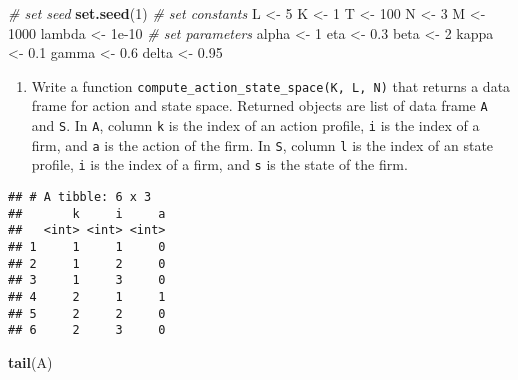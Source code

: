 \documentclass[
]{book}
\newenvironment{Shaded}{\begin{snugshade}}{\end{snugshade}}
\newcommand{\CommentTok}[1]{\textcolor[rgb]{0.56,0.35,0.01}{\textit{#1}}}
\newcommand{\DecValTok}[1]{\textcolor[rgb]{0.00,0.00,0.81}{#1}}
\newcommand{\FloatTok}[1]{\textcolor[rgb]{0.00,0.00,0.81}{#1}}
\newcommand{\KeywordTok}[1]{\textcolor[rgb]{0.13,0.29,0.53}{\textbf{#1}}}
\newcommand{\NormalTok}[1]{#1}
\newcommand{\OperatorTok}[1]{\textcolor[rgb]{0.81,0.36,0.00}{\textbf{#1}}}
\newcommand{\StringTok}[1]{\textcolor[rgb]{0.31,0.60,0.02}{#1}}
\providecommand{\tightlist}{%
  \setlength{\itemsep}{0pt}\setlength{\parskip}{0pt}}
\begin{document}
\begin{Shaded}
\begin{Highlighting}[]
\CommentTok{# set seed}
\KeywordTok{set.seed}\NormalTok{(}\DecValTok{1}\NormalTok{)}
\CommentTok{# set constants }
\NormalTok{L <-}\StringTok{ }\DecValTok{5}
\NormalTok{K <-}\StringTok{ }\DecValTok{1}
\NormalTok{T <-}\StringTok{ }\DecValTok{100}
\NormalTok{N <-}\StringTok{ }\DecValTok{3}
\NormalTok{M <-}\StringTok{ }\DecValTok{1000}
\NormalTok{lambda <-}\StringTok{ }\FloatTok{1e-10}
\CommentTok{# set parameters}
\NormalTok{alpha <-}\StringTok{ }\DecValTok{1}
\NormalTok{eta <-}\StringTok{ }\FloatTok{0.3}
\NormalTok{beta <-}\StringTok{ }\DecValTok{2}
\NormalTok{kappa <-}\StringTok{ }\FloatTok{0.1}
\NormalTok{gamma <-}\StringTok{ }\FloatTok{0.6}
\NormalTok{delta <-}\StringTok{ }\FloatTok{0.95}
\end{Highlighting}
\end{Shaded}

\begin{enumerate}
\def\labelenumi{\arabic{enumi}.}
\setcounter{enumi}{1}
\tightlist
\item
  Write a function \texttt{compute\_action\_state\_space(K,\ L,\ N)} that returns a data frame for action and state space. Returned objects are list of data frame \texttt{A} and \texttt{S}. In \texttt{A}, column \texttt{k} is the index of an action profile, \texttt{i} is the index of a firm, and \texttt{a} is the action of the firm. In \texttt{S}, column \texttt{l} is the index of an state profile, \texttt{i} is the index of a firm, and \texttt{s} is the state of the firm.
\end{enumerate}

\begin{Shaded}
\end{Shaded}

\begin{verbatim}
## # A tibble: 6 x 3
##       k     i     a
##   <int> <int> <int>
## 1     1     1     0
## 2     1     2     0
## 3     1     3     0
## 4     2     1     1
## 5     2     2     0
## 6     2     3     0
\end{verbatim}

\begin{Shaded}
\begin{Highlighting}[]
\KeywordTok{tail}\NormalTok{(A)}
\end{Highlighting}
\end{Shaded}
\end{document}
